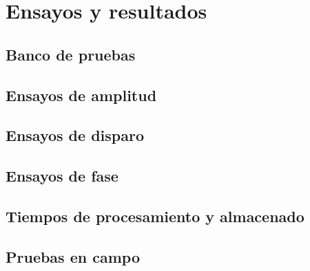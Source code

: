 
\chapter{Ensayos y resultados} %

\label{Chapter4} %


\section{Banco de pruebas}

\section{Ensayos de amplitud}

\section{Ensayos de disparo}

\section{Ensayos de fase}

\section{Tiempos de procesamiento y almacenado}

\section{Pruebas en campo}
